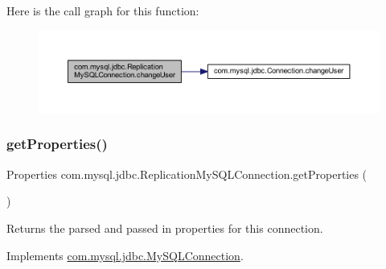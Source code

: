 Here is the call graph for this function\+:
\nopagebreak
\begin{figure}[H]
\begin{center}
\leavevmode
\includegraphics[width=350pt]{classcom_1_1mysql_1_1jdbc_1_1_replication_my_s_q_l_connection_adf68b57206ecf667f69b8d6243ac50d7_cgraph}
\end{center}
\end{figure}
\mbox{\label{classcom_1_1mysql_1_1jdbc_1_1_replication_my_s_q_l_connection_a93f7c5bbec567b742e4f9f94b81f1493}} 
\subsubsection{\texorpdfstring{get\+Properties()}{getProperties()}}
{\footnotesize\ttfamily Properties com.\+mysql.\+jdbc.\+Replication\+My\+S\+Q\+L\+Connection.\+get\+Properties (\begin{DoxyParamCaption}{ }\end{DoxyParamCaption})}

Returns the parsed and passed in properties for this connection. 

Implements \mbox{\hyperlink{interfacecom_1_1mysql_1_1jdbc_1_1_my_s_q_l_connection_a494cb1c438fb5e65b5fb9916c8331191}{com.\+mysql.\+jdbc.\+My\+S\+Q\+L\+Connection}}.

